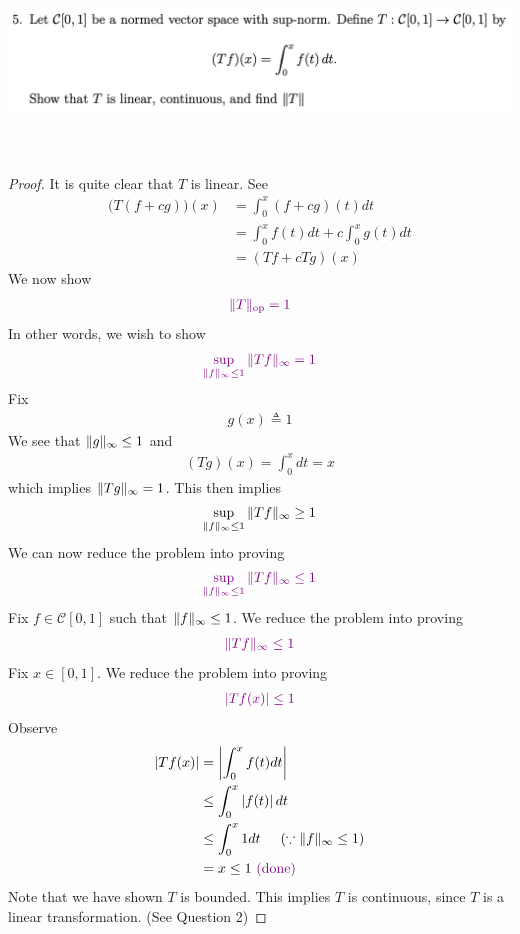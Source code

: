 \documentclass{report}
\begin{document}
\begin{question}{}{}
\includegraphics[height=5cm,width=18cm]{ahw4q5}
\end{question}
\begin{proof}
It is quite clear that $T$ is linear. See 
\begin{align*}
  \big(T(f+cg) \big)(x)&=\int_0^x (f+cg)(t)dt\\
  &=\int_0^x f(t)dt + c\int_0^x g(t)dt\\
  &=(Tf+cTg)(x)
\end{align*}
We now show 
\begin{align*}
\textcolor{violet}{\| T \|_\text{op}=1}
\end{align*}
In other words, we wish to show 
\begin{align*}
  \textcolor{violet}{\sup_{\| f \|_\infty\leq 1}\| Tf \|_{\infty}=1}
\end{align*}
Fix 
\begin{align*}
g(x)\triangleq 1
\end{align*}
We see that $\| g \|_\infty\leq 1$ and 
\begin{align*}
  (Tg)(x)=\int_0^x dt=x
\end{align*}
which implies $\| Tg \|_{\infty}=1$. This then implies 
\begin{align*}
\sup_{\| f \|_\infty \leq 1}\| Tf \|_\infty \geq 1
\end{align*}
We can now reduce the problem into proving 
\begin{align*}
\textcolor{violet}{\sup_{\| f \|_\infty \leq 1}\| Tf \|_\infty \leq 1}
\end{align*}
Fix $f\in \mathcal{C}[0,1]$ such that $\| f \|_\infty\leq 1$. We reduce the problem into proving 
\begin{align*}
  \textcolor{violet}{\| Tf \|_\infty \leq 1}
\end{align*}
Fix $x \in [0,1]$. We reduce the problem into proving 
\begin{align*}
  \textcolor{violet}{\left|Tf(x)\right|\leq 1}
\end{align*}
Observe 
\begin{align*}
\left|Tf(x)\right|&=\left|\int_0^x f(t)dt\right|\\
&\leq \int_0^x \left|f(t)\right|dt\\
&\leq \int_0^x 1dt\hspace{0.5cm}(\because \| f \|_\infty \leq 1)\\
&=x \leq 1\textcolor{violet}{\text{ (done) }}
\end{align*}
Note that we have shown $T$ is bounded. This implies $T$ is continuous, since $T$ is a linear transformation. (See Question 2) 
\end{proof}
\end{document}
